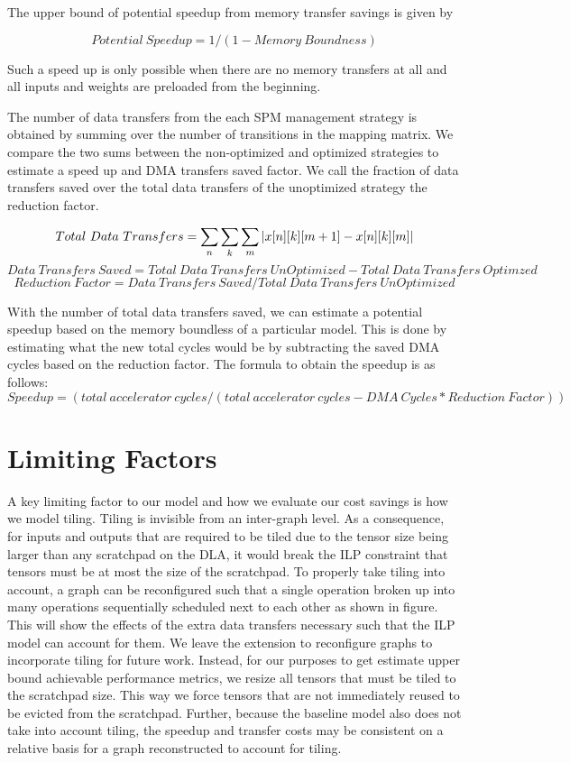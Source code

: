 The upper bound of potential speedup from memory transfer savings is given by

\[
    Potential\ Speedup = 1/(1 - Memory\ Boundness)
\]

Such a speed up is only possible when there are no memory transfers at all and all
inputs and weights are preloaded from the beginning.

%
The number of data transfers from the each SPM management strategy is obtained
by summing over the number of transitions in the mapping matrix. We compare the
two sums between the non-optimized and optimized strategies to estimate a speed
up and DMA transfers saved factor. We call the fraction of data transfers saved
over the total data transfers of the unoptimized strategy the reduction factor.

\[
	Total\ Data\ Transfers = \sum_n \sum_k \sum_m |x[n][k][m+1] - x[n][k][m]|\\
\]
\[
	Data\ Transfers\ Saved = Total\ Data\ Transfers\ UnOptimized - Total\ Data\ Transfers\ Optimzed
\]
\[
	Reduction\ Factor = Data\ Transfers\ Saved / Total\ Data\ Transfers\ UnOptimized
\]

With the number of total data transfers saved, we can estimate a potential speedup
based on the memory boundless of a particular model. This is done by estimating what
the new total cycles would be by subtracting the saved DMA cycles based on the reduction
factor. The formula to obtain the speedup is as follows:
\[
	Speedup = (total\ accelerator\ cycles / (total\ accelerator\ cycles - DMA\ Cycles *
	Reduction\ Factor))
\]

\section{Limiting Factors}
A key limiting factor to our model and how we evaluate our cost savings is how
we model tiling. Tiling is invisible from an inter-graph level. As a
consequence, for inputs and outputs that are required to be tiled due to the
tensor size being larger than any scratchpad on the DLA, it would break the ILP
constraint that tensors must be at most the size of the scratchpad.  To
properly take tiling into account, a graph can be reconfigured such that a
single operation broken up into many operations
sequentially scheduled next to each other as shown in figure. %
This will show the effects of the extra data transfers necessary such that the 
ILP model can account for them. We leave the extension to reconfigure graphs
to incorporate tiling for future work. Instead, for our purposes to get
estimate upper bound achievable performance metrics, we resize all tensors
that must be tiled to the scratchpad size. This way we force tensors that
are not immediately reused to be evicted from the scratchpad. Further, because
the baseline model also does not take into account tiling, the speedup and 
transfer costs may be consistent on a relative basis for a graph reconstructed
to account for tiling.


